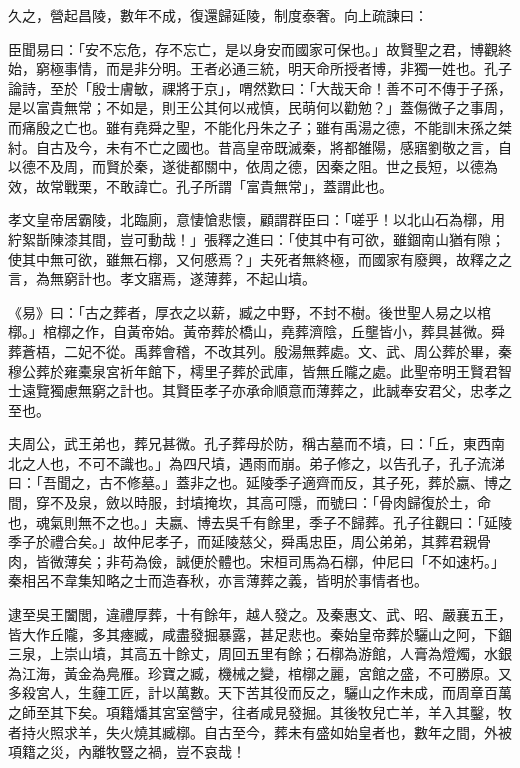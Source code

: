 \begin{pinyinscope}
久之，營起昌陵，數年不成，復還歸延陵，制度泰奢。向上疏諫曰：

臣聞易曰：「安不忘危，存不忘亡，是以身安而國家可保也。」故賢聖之君，博觀終始，窮極事情，而是非分明。王者必通三統，明天命所授者博，非獨一姓也。孔子論詩，至於「殷士膚敏，祼將于京」，喟然歎曰：「大哉天命！善不可不傳于子孫，是以富貴無常；不如是，則王公其何以戒慎，民萌何以勸勉？」蓋傷微子之事周，而痛殷之亡也。雖有堯舜之聖，不能化丹朱之子；雖有禹湯之德，不能訓末孫之桀紂。自古及今，未有不亡之國也。昔高皇帝既滅秦，將都雒陽，感寤劉敬之言，自以德不及周，而賢於秦，遂徙都關中，依周之德，因秦之阻。世之長短，以德為效，故常戰栗，不敢諱亡。孔子所謂「富貴無常」，蓋謂此也。

孝文皇帝居霸陵，北臨廁，意悽愴悲懷，顧謂群臣曰：「嗟乎！以北山石為槨，用紵絮斮陳漆其間，豈可動哉！」張釋之進曰：「使其中有可欲，雖錮南山猶有隙；使其中無可欲，雖無石槨，又何慼焉？」夫死者無終極，而國家有廢興，故釋之之言，為無窮計也。孝文寤焉，遂薄葬，不起山墳。

《易》曰：「古之葬者，厚衣之以薪，臧之中野，不封不樹。後世聖人易之以棺槨。」棺槨之作，自黃帝始。黃帝葬於橋山，堯葬濟陰，丘壟皆小，葬具甚微。舜葬蒼梧，二妃不從。禹葬會稽，不改其列。殷湯無葬處。文、武、周公葬於畢，秦穆公葬於雍橐泉宮祈年館下，樗里子葬於武庫，皆無丘隴之處。此聖帝明王賢君智士遠覽獨慮無窮之計也。其賢臣孝子亦承命順意而薄葬之，此誠奉安君父，忠孝之至也。

夫周公，武王弟也，葬兄甚微。孔子葬母於防，稱古墓而不墳，曰：「丘，東西南北之人也，不可不識也。」為四尺墳，遇雨而崩。弟子修之，以告孔子，孔子流涕曰：「吾聞之，古不修墓。」蓋非之也。延陵季子適齊而反，其子死，葬於嬴、博之間，穿不及泉，斂以時服，封墳掩坎，其高可隱，而號曰：「骨肉歸復於土，命也，魂氣則無不之也。」夫嬴、博去吳千有餘里，季子不歸葬。孔子往觀曰：「延陵季子於禮合矣。」故仲尼孝子，而延陵慈父，舜禹忠臣，周公弟弟，其葬君親骨肉，皆微薄矣；非苟為儉，誠便於體也。宋桓司馬為石槨，仲尼曰「不如速朽。」秦相呂不韋集知略之士而造春秋，亦言薄葬之義，皆明於事情者也。

逮至吳王闔閭，違禮厚葬，十有餘年，越人發之。及秦惠文、武、昭、嚴襄五王，皆大作丘隴，多其瘞臧，咸盡發掘暴露，甚足悲也。秦始皇帝葬於驪山之阿，下錮三泉，上崇山墳，其高五十餘丈，周回五里有餘；石槨為游館，人膏為燈燭，水銀為江海，黃金為鳧雁。珍寶之臧，機械之變，棺槨之麗，宮館之盛，不可勝原。又多殺宮人，生薶工匠，計以萬數。天下苦其役而反之，驪山之作未成，而周章百萬之師至其下矣。項籍燔其宮室營宇，往者咸見發掘。其後牧兒亡羊，羊入其鑿，牧者持火照求羊，失火燒其臧槨。自古至今，葬未有盛如始皇者也，數年之間，外被項籍之災，內離牧豎之禍，豈不哀哉！


\end{pinyinscope}
